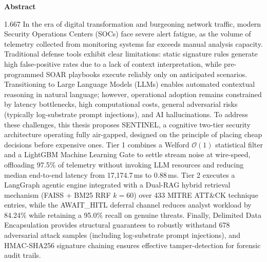 \documentclass[12pt,a4paper]{report}
\begin{document}
\pagestyle{fancy}
\setcounter{page}{1}

\newpage
{}
\begin{center}
    {\Large\textbf{Abstract}}
\end{center}
\vspace{0.5cm}

\begin{spacing}{1.667}
In the era of digital transformation and burgeoning network traffic, modern Security Operations Centers (SOCs) face severe alert fatigue, as the volume of telemetry collected from monitoring systems far exceeds manual analysis capacity. Traditional defense tools exhibit clear limitations: static signature rules generate high false-positive rates due to a lack of context interpretation, while pre-programmed SOAR playbooks execute reliably only on anticipated scenarios. Transitioning to Large Language Models (LLMs) enables automated contextual reasoning in natural language; however, operational adoption remains constrained by latency bottlenecks, high computational costs, general adversarial risks (typically log-substrate prompt injections), and AI hallucinations. To address these challenges, this thesis proposes SENTINEL, a cognitive two-tier security architecture operating fully air-gapped, designed on the principle of placing cheap decisions before expensive ones. Tier 1 combines a Welford $\mathcal{O}(1)$ statistical filter and a LightGBM Machine Learning Gate to settle stream noise at wire-speed, offloading 97.5\% of telemetry without invoking LLM resources and reducing median end-to-end latency from 17,174.7\,ms to 0.88\,ms. Tier 2 executes a LangGraph agentic engine integrated with a Dual-RAG hybrid retrieval mechanism (FAISS + BM25 RRF $k=60$) over 433 MITRE ATT\&CK technique entries, while the AWAIT\_HITL deferral channel reduces analyst workload by 84.24\% while retaining a 95.0\% recall on genuine threats. Finally, Delimited Data Encapsulation provides structural guarantees to robustly withstand 678 adversarial attack samples (including log-substrate prompt injections), and HMAC-SHA256 signature chaining ensures effective tamper-detection for forensic audit trails.
\end{spacing}
\end{document}
